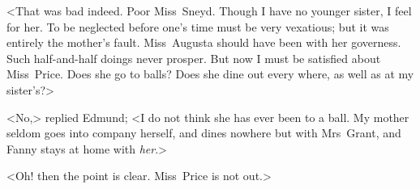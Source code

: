 <That was bad indeed. Poor Miss~Sneyd. Though I have no younger sister, I feel for her. To be neglected before one's time must be very vexatious; but it was entirely the mother's fault. Miss~Augusta should have been with her governess. Such half-and-half doings never prosper. But now I must be satisfied about Miss~Price. Does she go to balls? Does she dine out every where, as well as at my sister's?>

<No,> replied Edmund; <I do not think she has ever been to a ball. My mother seldom goes into company herself, and dines nowhere but with Mrs~Grant, and Fanny stays at home with \textit{her}.>

<Oh! then the point is clear. Miss~Price is not out.> 